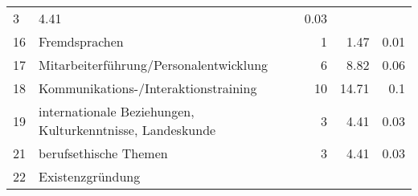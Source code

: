 \begin{longtable}{lXrrr}
       \num{3} &
       \num[round-mode=places,round-precision=2]{4.41} &
         \num[round-mode=places,round-precision=2]{0.03} \\

     16 &
     \multicolumn{1}{X}{ Fremdsprachen   } &


       \num{1} &
       \num[round-mode=places,round-precision=2]{1.47} &
         \num[round-mode=places,round-precision=2]{0.01} \\

     17 &
     \multicolumn{1}{X}{ Mitarbeiterführung/Personalentwicklung   } &


       \num{6} &
       \num[round-mode=places,round-precision=2]{8.82} &
         \num[round-mode=places,round-precision=2]{0.06} \\

     18 &
     \multicolumn{1}{X}{ Kommunikations-/Interaktionstraining   } &


       \num{10} &
       \num[round-mode=places,round-precision=2]{14.71} &
         \num[round-mode=places,round-precision=2]{0.1} \\

     19 &
     \multicolumn{1}{X}{ internationale Beziehungen, Kulturkenntnisse, Landeskunde   } &


       \num{3} &
       \num[round-mode=places,round-precision=2]{4.41} &
         \num[round-mode=places,round-precision=2]{0.03} \\

     21 &
     \multicolumn{1}{X}{ berufsethische Themen   } &


       \num{3} &
       \num[round-mode=places,round-precision=2]{4.41} &
         \num[round-mode=places,round-precision=2]{0.03} \\

     22 &
     \multicolumn{1}{X}{ Existenzgründung   } &



\end{longtable}
